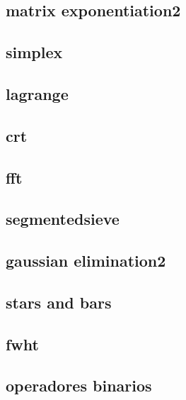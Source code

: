 \subsection{matrix exponentiation2}
\raggedbottom
\hrulefill
\subsection{simplex}
\raggedbottom
\hrulefill
\subsection{lagrange}
\raggedbottom
\hrulefill
\subsection{crt}
\raggedbottom
\hrulefill
\subsection{fft}
\raggedbottom
\hrulefill
\subsection{segmentedsieve}
\raggedbottom
\hrulefill
\subsection{gaussian elimination2}
\raggedbottom
\hrulefill
\subsection{stars and bars}
\raggedbottom
\hrulefill
\subsection{fwht}
\raggedbottom
\hrulefill
\subsection{operadores binarios}
\raggedbottom
\hrulefill
